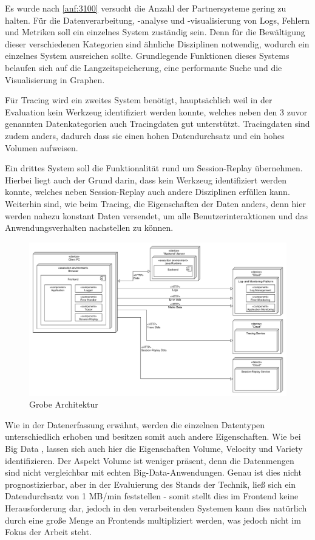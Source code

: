	Es wurde nach \autoref{anf:3100} versucht die Anzahl der Partnersysteme gering zu halten. Für die Datenverarbeitung, -analyse und -visualisierung von Logs, Fehlern und Metriken soll ein einzelnes System zuständig sein. Denn für die Bewältigung dieser verschiedenen Kategorien sind ähnliche Disziplinen notwendig, wodurch ein einzelnes System ausreichen sollte. Grundlegende Funktionen dieses Systems belaufen sich auf die Langzeitspeicherung, eine performante Suche und die Visualisierung in Graphen.
	
	Für Tracing wird ein zweites System benötigt, hauptsächlich weil in der Evaluation kein Werkzeug identifiziert werden konnte, welches neben den 3 zuvor genannten Datenkategorien auch Tracingdaten gut unterstützt. Tracingdaten sind zudem anders, dadurch dass sie einen hohen Datendurchsatz und ein hohes Volumen aufweisen.
	
	Ein drittes System soll die Funktionalität rund um Session-Replay übernehmen. Hierbei liegt auch der Grund darin, dass kein Werkzeug identifiziert werden konnte, welches neben Session-Replay auch andere Disziplinen erfüllen kann. Weiterhin sind, wie beim Tracing, die Eigenschaften der Daten anders, denn hier werden nahezu konstant Daten versendet, um alle Benutzerinteraktionen und das Anwendungsverhalten nachstellen zu können.
	
\begin{figure}[H]
	\centering
	\includegraphics[width=0.65\linewidth]{img/04_erstellung-poc/konzept-simple.png}
	\caption{Grobe Architektur}
	\label{fig:grobe-architektur}
\end{figure}

Wie in der Datenerfassung erwähnt, werden die einzelnen Datentypen unterschiedlich erhoben und besitzen somit auch andere Eigenschaften. Wie bei Big Data \cite{ZikopoulosUnderstandingBigData}, lassen sich auch hier die Eigenschaften Volume, Velocity und Variety identifizieren. Der Aspekt Volume ist weniger präsent, denn die Datenmengen sind nicht vergleichbar mit echten Big-Data-Anwendungen. Genau ist dies nicht prognostizierbar, aber in der Evaluierung des Stands der Technik, ließ sich ein Datendurchsatz von 1 MB/min feststellen - somit stellt dies im Frontend keine Herausforderung dar, jedoch in den verarbeitenden Systemen kann dies natürlich durch eine große Menge an Frontends multipliziert werden, was jedoch nicht im Fokus der Arbeit steht.

